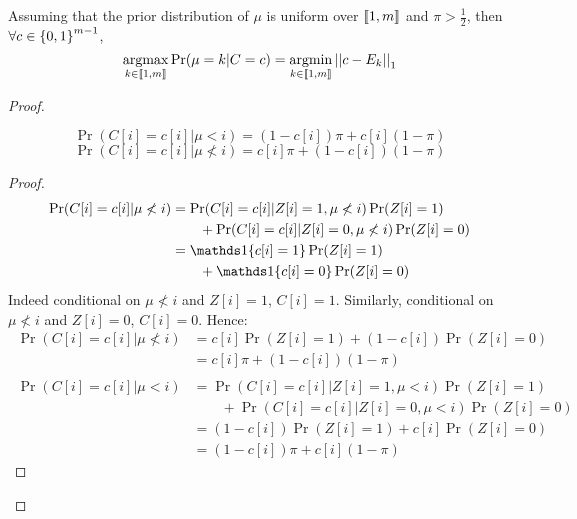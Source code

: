 \begin{thm}
    \label{thm:projection_appendix}
    Assuming that the prior distribution of $\mu$ is uniform over $\left\llbracket1, m\right\rrbracket$ and $\pi > \frac{1}{2}$, then \(\forall c \in \left\{ 0, 1 \right\}^{m-1}\),
    \[\operatorname*{argmax}_{k \in \left\llbracket1, m\right\rrbracket} \Pr(\mu = k | C = c) = \operatorname*{argmin}_{k \in \left\llbracket1, m\right\rrbracket} \left|\left|c - E_k\right|\right|_1\]
\end{thm}

\begin{proof}
\begin{lemma}
    \[ \Pr(C[i] = c[i] | \mu < i) = (1 - c[i]) \pi + c[i] (1 - \pi) \]
    \[ \Pr(C[i] = c[i] | \mu \not< i) = c[i] \pi + (1 - c[i]) (1 - \pi) \]
\end{lemma}
\begin{proof}
    \begin{align}
        \Pr(C[i] = c[i] | \mu \not< i)
        &= \Pr(C[i] = c[i] | Z[i] = 1, \mu \not< i) \Pr(Z[i] = 1) \\
        &\qquad + \Pr(C[i] = c[i] | Z[i] = 0, \mu \not< i) \Pr(Z[i] = 0)\\
                &= \II\{c[i]=1\} \Pr(Z[i] = 1) \\
        &\qquad + \II\{c[i]=0\} \Pr(Z[i] = 0)
    \end{align}
    Indeed conditional on $\mu \not< i$ and $Z[i] = 1$, $C[i] = 1$. Similarly, conditional on $\mu \not< i$ and $Z[i] = 0$, $C[i] = 0$. Hence:
    \begin{align}
        \ \Pr(C[i] = c[i] | \mu \not< i)
        &= c[i] \Pr(Z[i] = 1) + (1 - c[i]) \Pr(Z[i] = 0)\\
        &= c[i] \pi + (1 - c[i]) (1 - \pi)\\
    \end{align}
    \begin{align}
        \ \Pr(C[i] = c[i] | \mu < i)
        &= \Pr(C[i] = c[i] | Z[i] = 1, \mu < i) \Pr(Z[i] = 1) \\
        & \qquad + \Pr(C[i] = c[i] | Z[i] = 0, \mu < i) \Pr(Z[i] = 0)\\
        &= (1 - c[i]) \Pr(Z[i] = 1) + c[i] \Pr(Z[i] = 0)\\
        &= (1 - c[i]) \pi + c[i] (1 - \pi)
    \end{align}
\end{proof}


\end{proof}
